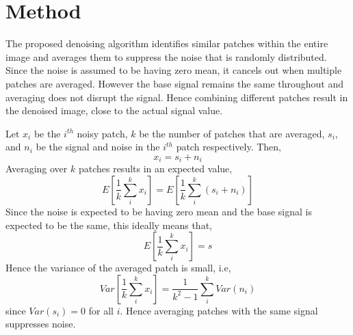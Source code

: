 \documentclass[fleqn,10pt]{wlscirep}
\begin{document}
	
	\section*{Method}
	
	The proposed denoising algorithm identifies similar patches within the entire image and averages them to suppress the noise that is randomly distributed. Since the noise is assumed to be having zero mean, it cancels out when multiple patches are averaged. However the base signal remains the same throughout and averaging does not disrupt the signal. Hence combining different patches result in the denoised image, close to the actual signal value. 
	
	Let $x_{i}$ be the $i^{th}$ noisy patch, $k$ be the number of patches that are averaged, $s_i$, and $n_i$ be the signal and noise in the $i^{th}$ patch respectively. Then,
	\begin{equation}
		x_i = s_i + n_i
	\end{equation}
	Averaging over $k$ patches results in an expected value,
	\begin{equation}
		E[\frac{1}{k}\sum_{i}^{k}x_i ] = E[\frac{1}{k}\sum_{i}^{k}(s_i + n_i) ]
	\end{equation}
	Since the noise is expected to be having zero mean and the base signal is expected to be the same, this ideally means that,
	\begin{equation}
		E[\frac{1}{k}\sum_{i}^{k}x_i ] = s
	\end{equation}
	Hence the variance of the averaged patch is small, i.e,
	\begin{equation}
		Var[\frac{1}{k}\sum_{i}^{k}x_i ] = \frac{1}{k^2 -1} \sum_{i}^{k}Var(n_i)
	\end{equation}
	since $Var(s_i) = 0$ for all $i$. Hence averaging patches with the same signal suppresses noise.
	
	
	
\end{document}
